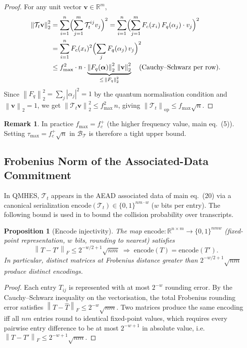 \documentclass[12pt,letterpaper]{article}
\theoremstyle{plain}
\newtheorem{proposition}[theorem]{Proposition}
\theoremstyle{definition}
\newtheorem{remark}[theorem]{Remark}
\newcommand{\T}{\mathcal{T}}
\newcommand{\calB}{\mathcal{B}}
\newcommand{\opnorm}[1]{\left\|#1\right\|_{\mathrm{op}}}
\newcommand{\frnorm}[1]{\left\|#1\right\|_{F}}
\newcommand{\vecnorm}[1]{\left\|#1\right\|_{2}}
\newcommand{\R}{\mathbb{R}}
\begin{document}
\begin{proof}
For any unit vector \(\mathbf{v} \in \R^m\),
\begin{align*}
  \vecnorm{\T_t \mathbf{v}}^2
  &= \sum_{i=1}^n \Bigl(\sum_{j=1}^m \T_t^{ij} v_j\Bigr)^2
  = \sum_{i=1}^n \Bigl(\sum_{j=1}^m F_c(x_i)\, F_q(\alpha_j) \cdot v_j
    \Bigr)^2 \\
  &= \sum_{i=1}^n F_c(x_i)^2
    \Bigl(\sum_j F_q(\alpha_j)\, v_j\Bigr)^2 \\
  &\leq f_{\max}^2 \cdot n \cdot
    \underbrace{\vecnorm{F_q(\boldsymbol{\alpha})}^2\,
      \vecnorm{\mathbf{v}}^2}_{\leq\, \vecnorm{F_q}^2}
    \quad\text{(Cauchy–Schwarz per row)}.
\end{align*}
Since \(\vecnorm{F_q}^2 = \sum_j |\alpha_j|^2 = 1\) by the quantum
normalisation condition and \(\vecnorm{\mathbf{v}}=1\), we get
\(\vecnorm{\T_t\mathbf{v}}^2 \leq f_{\max}^2\, n\),
giving \(\opnorm{\T_t} \leq f_{\max}\sqrt{n}\).
\end{proof}

\begin{remark}
In practice \(f_{\max} = f_c^+\) (the higher frequency value, main
eq.~(5)).  Setting \(\tau_{\max} = f_c^+\sqrt{n}\) in
\(\calB_{\T}\) is therefore a tight upper bound.
\end{remark}

\subsection{Frobenius Norm of the Associated-Data Commitment}

In QMHES, \(\T_t\) appears in the AEAD associated data of main eq.~(20)
via a canonical serialization
\(\mathrm{encode}(\T_t) \in \{0,1\}^{nm \cdot w}\) (\(w\) bits per
entry).  The following bound is used in  to
bound the collision probability over transcripts.

\begin{proposition}[Encode injectivity]
\label{prop:encode_injective}
The map \(\mathrm{encode}: \R^{n\times m} \to \{0,1\}^{nmw}\) (fixed-point
representation, \(w\) bits, rounding to nearest) satisfies
\[
  \frnorm{T - T'} \leq 2^{-w/2+1}\sqrt{nm}
  \;\Longrightarrow\;
  \mathrm{encode}(T) = \mathrm{encode}(T').
\]
In particular, distinct matrices at Frobenius distance greater than
\(2^{-w/2+1}\sqrt{nm}\) produce distinct encodings.
\end{proposition}
\begin{proof}
Each entry \(T_{ij}\) is represented with at most
\(2^{-w}\) rounding error.  By the Cauchy–Schwarz inequality on the
vectorisation, the total Frobenius rounding error satisfies
\(\frnorm{T - \hat T} \leq 2^{-w}\sqrt{nm}\).  Two matrices produce the
same encoding iff all \(nm\) entries round to identical fixed-point
values, which requires every pairwise entry difference to be at most
\(2^{-w+1}\) in absolute value, i.e.\
\(\frnorm{T-T'} \leq 2^{-w+1}\sqrt{nm}\).
\end{proof}
\end{document}
